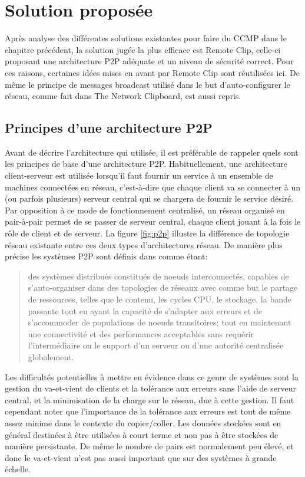 \chapter{Solution proposée}
\renewcommand{\leftmark}{\thechapter.~~Solution proposée}
Après analyse des différentes solutions existantes pour faire du CCMP dans
le chapitre précédent, la solution jugée la plus efficace
est Remote Clip, celle-ci proposant une architecture P2P adéquate et un
niveau de sécurité correct. Pour ces raisons, certaines idées mises en avant
par Remote Clip sont réutilisées ici. De même le principe de messages
broadcast utilisé dans le but d'auto-configurer le réseau, comme fait dans The
Network Clipboard, est aussi repris.

\section{Principes d'une architecture P2P}\label{sec:p2p}
Avant de décrire l'architecture qui utilisée, il est préférable
de rappeler quels sont les principes de base d'une architecture P2P.
Habituellement, une architecture client-serveur est utilisée lorsqu'il
faut fournir un service à un ensemble de machines connectées en réseau,
c'est-à-dire que chaque client va se connecter à un (ou parfois plusieurs)
serveur central qui se chargera de fournir le service désiré. Par opposition à
ce mode de fonctionnement centralisé, un réseau organisé en pair-à-pair
permet de se passer de serveur central, chaque client jouant à la fois le rôle
de client et de serveur. La figure \ref{fig:p2p} illustre la différence
de topologie réseau existante entre ces deux types d'architectures réseau.
De manière plus précise les systèmes P2P sont définis dans \cite{AS04} comme
étant:
\begin{quote}
  des systèmes distribués constitués de noeuds interconnectés, capables de
  s'auto-organiser dans des topologies de réseaux avec comme but le partage
  de ressources, telles que le contenu, les cycles CPU, le stockage,
  la bande passante tout en ayant la capacité de s'adapter aux erreurs et
  de s'accommoder de populations de noeuds transitoires; tout en maintenant
  une connectivité et des performances acceptables sans requérir
  l'intermédiaire ou le support d'un serveur ou d'une autorité
  centralisée globalement.
\end{quote}

Les difficultés potentielles à mettre en évidence dans ce genre de systèmes
sont la gestion du va-et-vient de clients et la tolérance aux erreurs
sans l'aide de serveur central, et la minimisation de la charge sur le réseau,
due à cette gestion. Il faut cependant noter que l'importance de la tolérance
aux erreurs est tout de même assez minime dans le contexte du copier/coller.
Les données stockées sont en général destinées à être utilisées à court terme
et non pas à être stockées de manière persistante. De même le nombre de pairs
est normalement peu élevé, et donc le va-et-vient n'est pas aussi
important que sur des systèmes à grande échelle.

